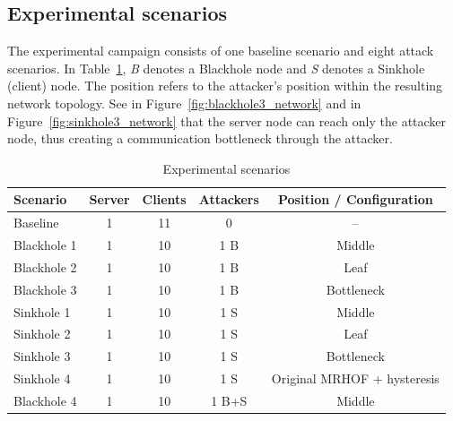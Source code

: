 \subsection{Experimental scenarios}
\label{subsec:experimental_scenarios}

The experimental campaign consists of one baseline scenario and eight attack scenarios. In Table~\ref{tab:experimental_scenarios}, \textit{B} denotes a Blackhole node and \textit{S} denotes a Sinkhole (client) node.
The position refers to the attacker's position within the resulting network topology.
See in Figure~\ref{fig:blackhole3_network} and in Figure~\ref{fig:sinkhole3_network} that the server node can reach only the attacker node, thus creating a communication bottleneck through the attacker.

\begin{table}[h]
\centering
\caption{Experimental scenarios}
\label{tab:experimental_scenarios}
\begin{tabular}{lcccc}
\hline
\textbf{Scenario} & \textbf{Server} & \textbf{Clients} &
\textbf{Attackers} & \textbf{Position / Configuration} \\
\hline
Baseline & 1 & 11 & 0 & -- \\
Blackhole 1 & 1 & 10 & 1 B & Middle \\
Blackhole 2 & 1 & 10 & 1 B & Leaf \\
Blackhole 3 & 1 & 10 & 1 B & Bottleneck \\
Sinkhole 1 & 1 & 10 & 1 S & Middle \\
Sinkhole 2 & 1 & 10 & 1 S & Leaf \\
Sinkhole 3 & 1 & 10 & 1 S & Bottleneck \\
Sinkhole 4 & 1 & 10 & 1 S & Original MRHOF + hysteresis \\
Blackhole 4 & 1 & 10 & 1 B+S & Middle \\
\hline
\end{tabular}
\end{table}

